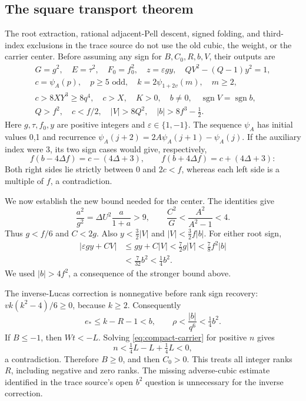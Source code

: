 \subsection{The square transport theorem}

The root extraction, rational adjacent-Pell descent, signed folding, and
third-index exclusions in the trace source do not use the old cubic, the
weight, or the carrier center.  Before assuming any sign for
\(B,C_0,R,b,V\), their outputs are
\begin{gather*}
G=g^2,\quad E=\tau^2,\quad F_0=f_0^2,\quad
z=\varepsilon gy,\quad QV^2-(Q-1)y^2=1,\\
c=\psi_A(p),\quad p\ge5\text{ odd},\quad
k=2\psi_{1+2v}(m),\quad m\ge2,\\
c>8XY^3\ge8q^4,\quad c>X,\quad K>0,\quad
b\ne0,\quad \operatorname{sgn}V=\operatorname{sgn}b,\\
Q>f^2,\quad c<f/2,\quad |V|>8Q^2,\quad
|b|>8f^3-\tfrac12.
\end{gather*}
Here \(g,\tau,f_0,y\) are positive integers and
\(\varepsilon\in\{1,-1\}\).  The sequence \(\psi_A\) has initial
values 0,1 and recurrence \(\psi_A(j+2)=2A\psi_A(j+1)-\psi_A(j)\).
If the auxiliary index were 3, its two sign cases would give, respectively,
\[
f(b-4\Delta f)=c-(4\Delta+3),\qquad
f(b+4\Delta f)=c+(4\Delta+3):
\]
Both right sides lie strictly between 0 and \(2c<f\), whereas each
left side is a multiple of $f$, a contradiction.

We now establish the new bound needed for the center.  The identities give
\[
\frac{a^2}{g^2}=\Delta U^2\frac{a}{1+a}>9,
\qquad \frac{C^2}{G}<\frac{A^2}{A^2-1}<4.
\]
Thus \(g<f/6\) and \(C<2g\).  Also
\(y<\tfrac32|V|\) and \(|V|<\tfrac32f|b|\).  For either root sign,
\begin{align*}
|\varepsilon gy+CV|
&\le gy+C|V|<\tfrac72g|V|
 <\tfrac78 f^2|b|\\
&<\tfrac7{32}b^2<\tfrac14b^2.
\end{align*}
We used \(|b|>4f^2\), a consequence of the stronger bound above.

The inverse-Lucas correction is nonnegative before rank sign recovery:
\(vk(k^2-4)/6\ge0\), because \(k\ge2\).  Consequently
\[
e_*\le k-R-1<b,\qquad \rho<\frac{|b|}{q^6}<\tfrac14b^2.
\]
If \(B\le-1\), then \(Wt<-L\).  Solving
\eqref{eq:compact-carrier} for positive \(n\) gives
\[
n<\tfrac14L-L+\tfrac14L<0,
\]
a contradiction.  Therefore \(B\ge0\), and then \(C_0>0\).
This treats all integer ranks \(R\), including negative and zero ranks.
The missing adverse-cubic estimate identified in the trace source's open
\(b^2\) question is unnecessary for the inverse correction.


